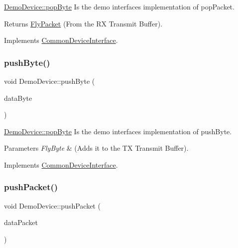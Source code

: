 \hyperlink{class_demo_device_a788dd7e426fab9c8d19ea9fd106260d4}{Demo\+Device\+::pop\+Byte} Is the demo interface\textquotesingle{}s implementation of pop\+Packet. 

\begin{DoxyReturn}{Returns}
\hyperlink{class_fly_packet}{Fly\+Packet} (From the RX Transmit Buffer). 
\end{DoxyReturn}


Implements \hyperlink{class_common_device_interface_a1b9c96bffa9af46a054e7ce0c341ea19}{Common\+Device\+Interface}.

\hypertarget{class_demo_device_a064f0bc683663200243bd68ff3713c68}{}\label{class_demo_device_a064f0bc683663200243bd68ff3713c68} 
\subsubsection{\texorpdfstring{push\+Byte()}{pushByte()}}
{\footnotesize\ttfamily void Demo\+Device\+::push\+Byte (\begin{DoxyParamCaption}\item[{\hyperlink{conversions_8h_a1f006e31a957accfe6aa1bf6f401efce}{Fly\+Byte}}]{data\+Byte }\end{DoxyParamCaption})\hspace{0.3cm}{\ttfamily [virtual]}}



\hyperlink{class_demo_device_a788dd7e426fab9c8d19ea9fd106260d4}{Demo\+Device\+::pop\+Byte} Is the demo interface\textquotesingle{}s implementation of push\+Byte. 


\begin{DoxyParams}{Parameters}
{\em Fly\+Byte} & (Adds it to the TX Transmit Buffer). \\
\hline
\end{DoxyParams}


Implements \hyperlink{class_common_device_interface_aadb344329a9235fbfa781611b4f769e1}{Common\+Device\+Interface}.

\hypertarget{class_demo_device_ac39f46589b28926cd40635ad42342a54}{}\label{class_demo_device_ac39f46589b28926cd40635ad42342a54} 
\subsubsection{\texorpdfstring{push\+Packet()}{pushPacket()}}
{\footnotesize\ttfamily void Demo\+Device\+::push\+Packet (\begin{DoxyParamCaption}\item[{\hyperlink{class_fly_packet}{Fly\+Packet}}]{data\+Packet }\end{DoxyParamCaption})\hspace{0.3cm}{\ttfamily [virtual]}}



